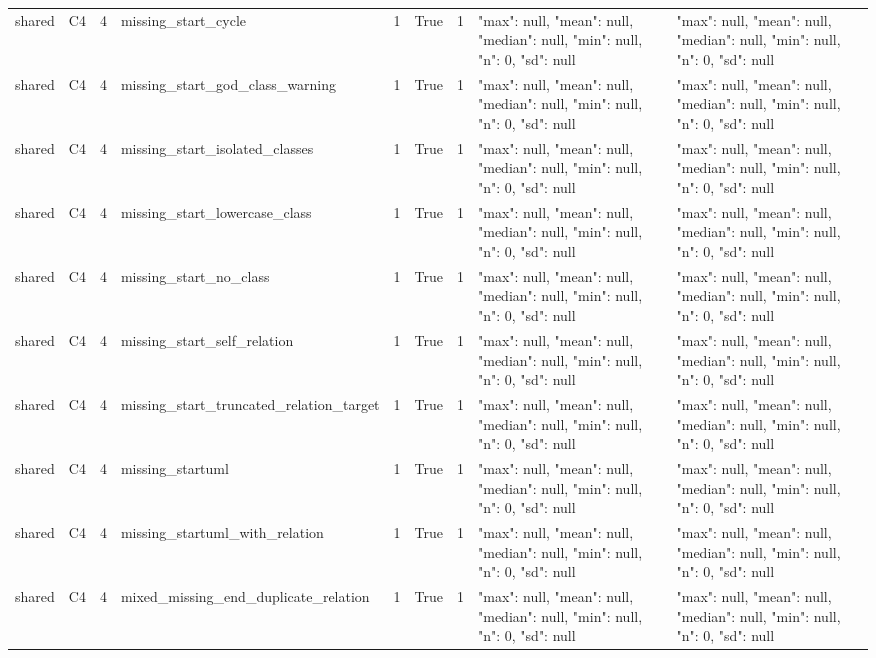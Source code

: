 \begin{tabular}{lllllllll}
shared & C4 & 4 & missing\_start\_cycle & 1 & True & 1 & {"max": null, "mean": null, "median": null, "min": null, "n": 0, "sd": null} & {"max": null, "mean": null, "median": null, "min": null, "n": 0, "sd": null} \\
shared & C4 & 4 & missing\_start\_god\_class\_warning & 1 & True & 1 & {"max": null, "mean": null, "median": null, "min": null, "n": 0, "sd": null} & {"max": null, "mean": null, "median": null, "min": null, "n": 0, "sd": null} \\
shared & C4 & 4 & missing\_start\_isolated\_classes & 1 & True & 1 & {"max": null, "mean": null, "median": null, "min": null, "n": 0, "sd": null} & {"max": null, "mean": null, "median": null, "min": null, "n": 0, "sd": null} \\
shared & C4 & 4 & missing\_start\_lowercase\_class & 1 & True & 1 & {"max": null, "mean": null, "median": null, "min": null, "n": 0, "sd": null} & {"max": null, "mean": null, "median": null, "min": null, "n": 0, "sd": null} \\
shared & C4 & 4 & missing\_start\_no\_class & 1 & True & 1 & {"max": null, "mean": null, "median": null, "min": null, "n": 0, "sd": null} & {"max": null, "mean": null, "median": null, "min": null, "n": 0, "sd": null} \\
shared & C4 & 4 & missing\_start\_self\_relation & 1 & True & 1 & {"max": null, "mean": null, "median": null, "min": null, "n": 0, "sd": null} & {"max": null, "mean": null, "median": null, "min": null, "n": 0, "sd": null} \\
shared & C4 & 4 & missing\_start\_truncated\_relation\_target & 1 & True & 1 & {"max": null, "mean": null, "median": null, "min": null, "n": 0, "sd": null} & {"max": null, "mean": null, "median": null, "min": null, "n": 0, "sd": null} \\
shared & C4 & 4 & missing\_startuml & 1 & True & 1 & {"max": null, "mean": null, "median": null, "min": null, "n": 0, "sd": null} & {"max": null, "mean": null, "median": null, "min": null, "n": 0, "sd": null} \\
shared & C4 & 4 & missing\_startuml\_with\_relation & 1 & True & 1 & {"max": null, "mean": null, "median": null, "min": null, "n": 0, "sd": null} & {"max": null, "mean": null, "median": null, "min": null, "n": 0, "sd": null} \\
shared & C4 & 4 & mixed\_missing\_end\_duplicate\_relation & 1 & True & 1 & {"max": null, "mean": null, "median": null, "min": null, "n": 0, "sd": null} & {"max": null, "mean": null, "median": null, "min": null, "n": 0, "sd": null} \\

\end{tabular}
